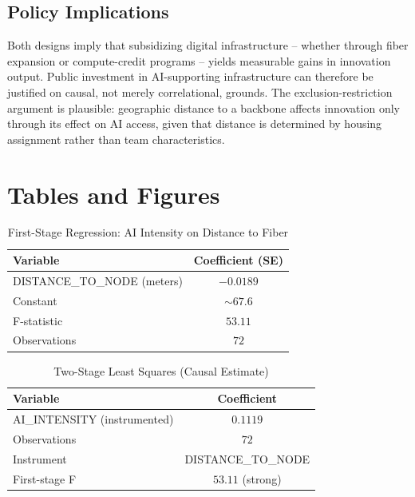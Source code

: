 \documentclass[12pt]{article}
\begin{document}
\subsection*{Policy Implications}

Both designs imply that subsidizing digital infrastructure -- whether
through fiber expansion or compute-credit programs -- yields measurable
gains in innovation output. Public investment in AI-supporting
infrastructure can therefore be justified on causal, not merely
correlational, grounds. The exclusion-restriction argument is plausible:
geographic distance to a backbone affects innovation only through its
effect on AI access, given that distance is determined by housing
assignment rather than team characteristics.

\section*{Tables and Figures}

\begin{table}[H]
\centering
\caption{First-Stage Regression: AI Intensity on Distance to Fiber}
\begin{tabular}{lc}
\toprule
\textbf{Variable} & \textbf{Coefficient (SE)} \\
\midrule
DISTANCE\_TO\_NODE (meters) & $-0.0189$ \\
Constant                    & $\sim 67.6$ \\
\midrule
F-statistic                 & $53.11$ \\
Observations                & $72$ \\
\bottomrule
\end{tabular}
\end{table}

\begin{table}[H]
\centering
\caption{Two-Stage Least Squares (Causal Estimate)}
\begin{tabular}{lc}
\toprule
\textbf{Variable} & \textbf{Coefficient} \\
\midrule
AI\_INTENSITY (instrumented) & $0.1119$ \\
\midrule
Observations                  & $72$ \\
Instrument                    & DISTANCE\_TO\_NODE \\
First-stage F                 & $53.11$ (strong) \\
\bottomrule
\end{tabular}
\end{table}
\end{document}
